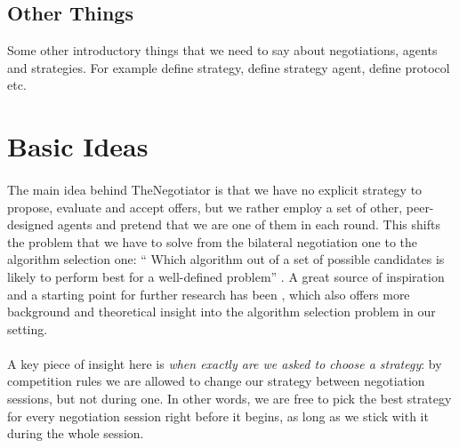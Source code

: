 \documentclass[12pt]{article}
\numberwithin{equation}{section}
\newcommand{\quotes}[1]{\textquotedblleft{} #1\textquotedblright}
\begin{document}


		\subsection{Other Things}	\label{sec:introduction.other_things}
			Some other introductory things that we need to say about negotiations, agents and strategies.
			For example define strategy, define strategy agent, define protocol etc.

	\section{Basic Ideas}		\label{sec:basic_ideas}

		\paragraph*{}
			The main idea behind TheNegotiator is that we have no explicit strategy to propose, evaluate and accept offers, but we rather employ a set of other, peer-designed agents and pretend that we are one of them in each round. %
			This shifts the problem that we have to solve from the bilateral negotiation one to the algorithm selection one: \quotes{Which algorithm out of a set of possible candidates is likely to perform best for a well-defined problem} \cite{original_alg_selection_paper_1975}. A great source of inspiration and a starting point for further research has been \cite{meta_agent_paper}, which also offers more background and theoretical insight into the algorithm selection problem in our setting.
			
		\paragraph*{}
			A key piece of insight here is \emph{when exactly are we asked to choose a strategy}: by competition rules we are allowed to change our strategy between negotiation sessions, but not during one.
			In other words, we are free to pick the best strategy for every negotiation session right before it begins, as long as we stick with it during the whole session.
		
\end{document}
